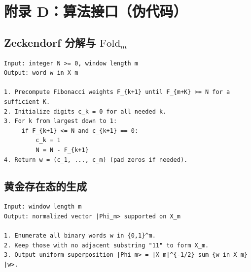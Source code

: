\section{附录 D：算法接口（伪代码）}

\subsection{Zeckendorf 分解与 \texorpdfstring{$\mathrm{Fold}_m$}{Fold\_m}}

\begin{Verbatim}
Input: integer N >= 0, window length m
Output: word w in X_m

1. Precompute Fibonacci weights F_{k+1} until F_{m+K} >= N for a sufficient K.
2. Initialize digits c_k = 0 for all needed k.
3. For k from largest down to 1:
     if F_{k+1} <= N and c_{k+1} == 0:
         c_k = 1
         N = N - F_{k+1}
4. Return w = (c_1, ..., c_m) (pad zeros if needed).
\end{Verbatim}

\subsection{黄金存在态的生成}

\begin{Verbatim}
Input: window length m
Output: normalized vector |Phi_m> supported on X_m

1. Enumerate all binary words w in {0,1}^m.
2. Keep those with no adjacent substring "11" to form X_m.
3. Output uniform superposition |Phi_m> = |X_m|^{-1/2} sum_{w in X_m} |w>.
\end{Verbatim}

